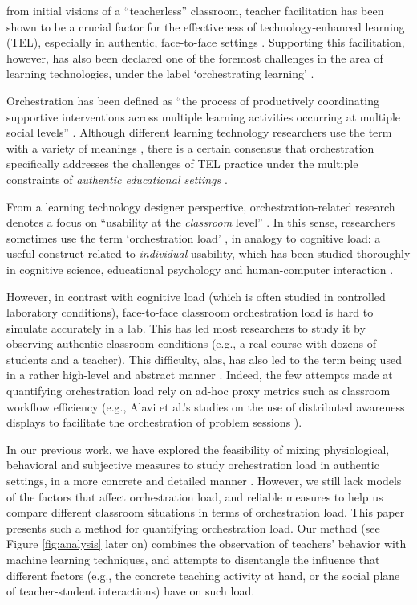 \documentclass[10pt,journal,compsoc]{IEEEtran}
\begin{document}

 from initial visions of a ``teacherless'' classroom, teacher facilitation has been shown to be a crucial factor for the effectiveness of technology-enhanced learning (TEL), especially in authentic, face-to-face settings \cite{Gomez2013,Onrubia2012}. Supporting this facilitation, however, has also been declared one of the foremost challenges in the area of learning technologies, under the label `orchestrating learning' \cite{STELLARorch}. 

Orchestration has been defined as ``the process of productively coordinating supportive interventions across multiple learning activities occurring at multiple social levels'' \cite{Dillenbourg2009}. Although different learning technology researchers use the term with a variety of meanings \cite{Prieto2011}, there is a certain consensus that orchestration specifically addresses the challenges of TEL practice under the multiple constraints of \textit{authentic educational settings} \cite{Roschelle2013}.

From a learning technology designer perspective, orchestration-related research denotes a focus on ``usability at the \textit{classroom} level'' \cite{Dillenbourg2011}. In this sense, researchers sometimes use the term `orchestration load' \cite{Dillenbourg2013,Cuendet2013,munoz2013sharing}, in analogy to cognitive load: a useful construct related to \textit{individual} usability, which has been studied thoroughly in cognitive science, educational psychology and human-computer interaction \cite{sweller1994cognitive,oviatt2006human}.

However, in contrast with cognitive load (which is often studied in controlled laboratory conditions), face-to-face classroom orchestration load is hard to simulate accurately in a lab. This has led most researchers to study it by observing authentic classroom conditions (e.g., a real course with dozens of students and a teacher). This difficulty, alas, has also led to the term being used in a rather high-level and abstract manner \cite{Dillenbourg2013,Cuendet2013}. Indeed, the few attempts made at quantifying orchestration load rely on ad-hoc proxy metrics such as classroom workflow efficiency (e.g., Alavi et al.'s studies on the use of distributed awareness displays to facilitate the orchestration of problem sessions \cite{Alavi2012}).

In our previous work, we have explored the feasibility of mixing physiological, behavioral and subjective measures to study orchestration load in authentic settings, in a more concrete and detailed manner \cite{Prieto2015ectel}. However, we still lack models of the factors that affect orchestration load, and reliable measures to help us compare different classroom situations in terms of orchestration load. This paper presents such a method for quantifying orchestration load. Our method (see Figure \ref{fig:analysis} later on) combines the observation of teachers' behavior with machine learning techniques, and attempts to disentangle the influence that different factors (e.g., the concrete teaching activity at hand, or the social plane of teacher-student interactions) have on such load.
\end{document}
